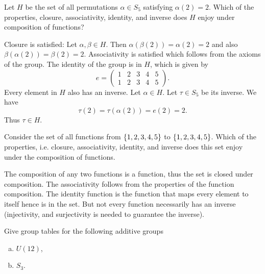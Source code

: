 \begin{problem}
	Let $ H $ be the set of all permutations $ \alpha \in S_5 $ satisfying $ \alpha(2) =2 $. Which of the properties, closure, associativity, identity, and inverse does $ H $ enjoy under composition of functions?
\end{problem}
\begin{solution}
	Closure is satisfied: Let $ \alpha,\beta \in H $. Then $ \alpha(\beta(2)) = \alpha(2) = 2 $ and also $ \beta(\alpha(2)) = \beta(2) = 2 $. Associativity is satisfied which follows from the axioms of the group. The identity of the group is in $ H $, which is given by
	\[ e = \begin{pmatrix} 1 & 2 & 3 & 4 & 5 \\ 1 & 2 & 3 & 4 & 5\end{pmatrix}. \] 
	Every element in $ H $ also has an inverse. Let $ \alpha \in H $. Let $ \tau \in S_5 $ be its inverse. We have
	\[ \tau(2) = \tau(\alpha(2)) = e(2) = 2. \]
	Thus $ \tau \in H $.
\end{solution}

\begin{problem}
	Consider the set of all functions from $ \{1,2,3,4,5\} $ to $ \{1,2,3,4,5\} $. Which of the properties, i.e. closure, associativity, identity, and inverse does this set enjoy under the composition of functions.
\end{problem}
\begin{solution}
	The composition of any two functions is a function, thus the set is closed under composition. The associativity follows from the properties of the function composition. The identity function is the function that maps every element to itself hence is in the set. But not every function necessarily has an inverse (injectivity, and surjectivity is needed to guarantee the inverse).
\end{solution}

\begin{problem}
	Give group tables for the following additive groups
	\begin{enumerate}[(a)]
		\item $ U(12) $,
		\item $ S_3 $.
	\end{enumerate}
\end{problem}

